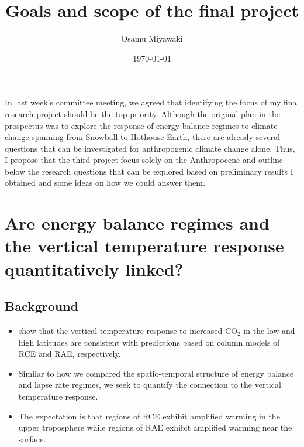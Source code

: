 \documentclass{article}
\title{Goals and scope of the final project}
\date{\today}
\author{Osamu Miyawaki}
\begin{document}
\maketitle

In last week's committee meeting, we agreed that identifying the focus of my final research project should be the top priority. Although the original plan in the prospectus was to explore the response of energy balance regimes to climate change spanning from Snowball to Hothouse Earth, there are already several questions that can be investigated for anthropogenic climate change alone. Thus, I propose that the third project focus solely on the Anthropocene and outline below the research questions that can be explored based on preliminary results I obtained and some ideas on how we could answer them. 

\section{Are energy balance regimes and the vertical temperature response quantitatively linked?}
\subsection{Background}
\begin{itemize}
	\item \cite{payne2015} show that the vertical temperature response to increased CO$_2$ in the low and high latitudes are consistent with predictions based on column models of RCE and RAE, respectively.
	\item Similar to how we compared the spatio-temporal structure of energy balance and lapse rate regimes, we seek to quantify the connection to the vertical temperature response. 
	\item The expectation is that regions of RCE exhibit amplified warming in the upper troposphere while regions of RAE exhibit amplified warming near the surface.
\end{itemize}
\end{document}
